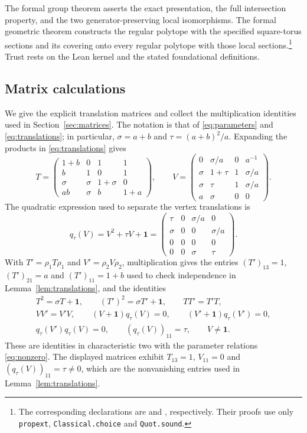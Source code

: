 \documentclass[11pt]{article}
\theoremstyle{definition}
\begin{document}
The formal group theorem asserts the exact presentation, the full
intersection property, and the two generator-preserving local isomorphisms.
The formal geometric theorem constructs the regular polytope with the
specified square-torus sections and its covering onto every regular
polytope with those local sections.\footnote{The corresponding declarations
are  and
, respectively. Their proofs use only
\texttt{propext}, \texttt{Classical.choice} and \texttt{Quot.sound}.}
Trust rests on the Lean kernel and the stated foundational definitions.

\begin{appendices}
\section{Matrix calculations}\label{app:matrices}
We give the explicit translation matrices and collect the multiplication
identities used in Section~\ref{sec:matrices}. The notation is that of
\eqref{eq:parameters} and \eqref{eq:translations}; in particular,
$\sigma=a+b$ and $\tau=(a+b)^2/a$.
Expanding the products in \eqref{eq:translations} gives
\[
 T=\begin{pmatrix}
 1+b&0&1&1\\ b&1&0&1\\
 \sigma&\sigma&1+\sigma&0\\ ab&\sigma&b&1+a
 \end{pmatrix},\qquad
 V=\begin{pmatrix}
 0&\sigma/a&0&a^{-1}\\
 \sigma&1+\tau&1&\sigma/a\\
 \sigma&\tau&1&\sigma/a\\
 a&\sigma&0&0
 \end{pmatrix}.
\]
The quadratic expression used to separate the vertex translations is
\[
 q_\tau(V)=V^2+\tau V+\mathbf 1=
 \begin{pmatrix}
 \tau&0&\sigma/a&0\\
 \sigma&0&0&\sigma/a\\
 0&0&0&0\\
 0&0&\sigma&\tau
 \end{pmatrix}.
\]
With $T'=\rho_1T\rho_1$ and $V'=\rho_2V\rho_2$, multiplication gives
the entries $(T')_{13}=1$, $(T')_{21}=a$ and $(T')_{11}=1+b$ used to
check independence in Lemma~\ref{lem:translations}, and the identities
\begin{equation}\label{eq:identities}
\begin{gathered}
 T^2=\sigma T+\mathbf 1,\qquad (T')^2=\sigma T'+\mathbf 1,\qquad TT'=T'T,\\
 VV'=V'V,\qquad (V+\mathbf 1)q_\tau(V)=0,\qquad
                   (V'+\mathbf 1)q_\tau(V')=0,\\
 q_\tau(V')q_\tau(V)=0,\qquad (q_\tau(V))_{11}=\tau,\qquad V\ne \mathbf 1.
\end{gathered}
\end{equation}
These are identities in characteristic two with the parameter relations
\eqref{eq:nonzero}. The displayed matrices exhibit $T_{13}=1$,
$V_{11}=0$ and $(q_\tau(V))_{11}=\tau\ne0$, which are the nonvanishing
entries used in Lemma~\ref{lem:translations}.


\end{appendices}
\end{document}

